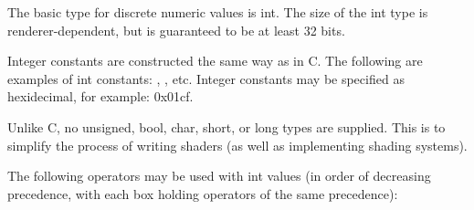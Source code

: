 \documentclass[11pt,letterpaper]{book}
\def\inttype{{\cf int}\xspace}
\begin{document}
The basic type for discrete numeric values is {\cf int}.  The size of
the {\cf int} type is renderer-dependent, but is guaranteed to be at
least 32 bits.

Integer constants are constructed the same way as in C.  The following
are examples of {\cf int} constants: {}, {}, etc. Integer
constants may be specified as hexidecimal, for example: {\cf 0x01cf}.

Unlike C, no unsigned, bool, char, short, or long types are supplied.
This is to simplify the process of writing shaders (as well as
implementing shading systems).

The following operators may be used with \inttype values (in order of
decreasing precedence, with each box holding operators of the same
precedence):

\smallskip
\end{document}
